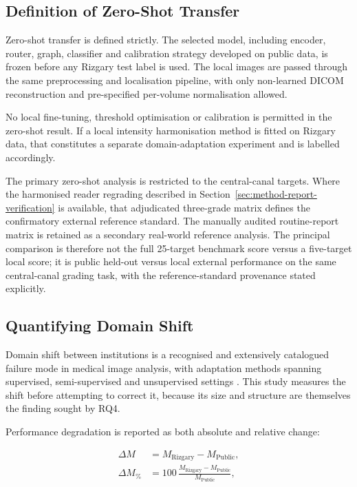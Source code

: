 \subsection{Definition of Zero-Shot Transfer}
\label{sec:method-zero-shot}

Zero-shot transfer is defined strictly. The selected model, including encoder,
router, graph, classifier and calibration strategy developed on public data, is
frozen before any Rizgary test label is used. The local images are passed
through the same preprocessing and localisation pipeline, with only
non-learned DICOM reconstruction and pre-specified per-volume normalisation
allowed.

No local fine-tuning, threshold optimisation or calibration is permitted in the
zero-shot result. If a local intensity harmonisation method is fitted on Rizgary
data, that constitutes a separate domain-adaptation experiment and is labelled
accordingly.

The primary zero-shot analysis is restricted to the central-canal targets.
Where the harmonised reader regrading described in
Section~\ref{sec:method-report-verification} is available, that adjudicated
three-grade matrix defines the confirmatory external reference standard. The
manually audited routine-report matrix is retained as a secondary real-world
reference analysis. The principal comparison is therefore not the full 25-target
benchmark score versus a five-target local score; it is public held-out versus
local external performance on the same central-canal grading task, with the
reference-standard provenance stated explicitly.

\subsection{Quantifying Domain Shift}
\label{sec:method-domain-shift}

Domain shift between institutions is a recognised and extensively catalogued
failure mode in medical image analysis, with adaptation methods spanning
supervised, semi-supervised and unsupervised settings \cite{guan2022domain}.
This study measures the shift before attempting to correct it, because its size
and structure are themselves the finding sought by RQ4.

Performance degradation is reported as both absolute and relative change:

\begin{align}
\Delta M &= M_{\mathrm{Rizgary}}-M_{\mathrm{Public}},\\
\Delta M_{\%} &=
100\,
\frac{M_{\mathrm{Rizgary}}-M_{\mathrm{Public}}}
{M_{\mathrm{Public}}},
\end{align}

